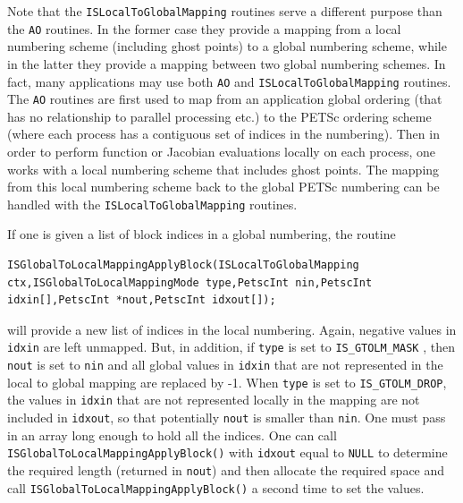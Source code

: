Note that the \lstinline{ISLocalToGlobalMapping} routines serve a different purpose
than the \lstinline{AO} routines. In the former case they provide a mapping
from  a local numbering scheme (including ghost points) to a global numbering scheme,
while in the latter they provide a mapping between two global numbering schemes.
In fact, many applications may use both \lstinline{AO} and \lstinline{ISLocalToGlobalMapping} routines.
The \lstinline{AO} routines are first used to map from an application global ordering
(that has no relationship to parallel processing etc.) to the PETSc ordering scheme
(where each process has a contiguous set of indices in the numbering). Then in order
to perform function or Jacobian evaluations locally on each process, one works
with a local numbering scheme that includes ghost points.  The mapping from this local
numbering scheme back to the global PETSc numbering can be handled with the
\lstinline{ISLocalToGlobalMapping} routines.

If one is given a list of block indices in a global numbering, the routine
\begin{lstlisting}
ISGlobalToLocalMappingApplyBlock(ISLocalToGlobalMapping ctx,ISGlobalToLocalMappingMode type,PetscInt nin,PetscInt idxin[],PetscInt *nout,PetscInt idxout[]);
\end{lstlisting}
 will provide
a new list of indices in the local numbering. Again, negative values in
\lstinline{idxin} are left unmapped.  But, in addition, if \lstinline{type} is set to
\lstinline{IS_GTOLM_MASK}
,
then \lstinline{nout} is set to \lstinline{nin} and all global values
in \lstinline{idxin} that are not represented in the local to global mapping
are replaced by -1. When \lstinline{type} is set to \lstinline{IS_GTOLM_DROP},
 the values in \lstinline{idxin} that are not
represented locally in the mapping are not included in \lstinline{idxout}, so that
potentially \lstinline{nout} is smaller than \lstinline{nin}.  One must
pass in an array long enough to hold all the indices. One can call
\lstinline{ISGlobalToLocalMappingApplyBlock()} with \lstinline{idxout} equal to
\lstinline{NULL} to determine the required length (returned in
\lstinline{nout}) and then allocate the required space and call
\lstinline{ISGlobalToLocalMappingApplyBlock()} a second time to set the values.

